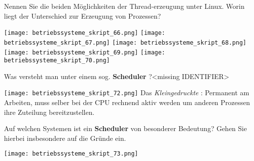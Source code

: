 \documentclass{article}
\begin{document}
\begin{tcolorbox}[colback=white!10!white,colframe=lightgray!75!black,
  savelowerto=\jobname_ex.tex,breakable,enhanced,lines before break=40]

\begin{center}
Nennen Sie die beiden Möglichkeiten der Thread-erzeugung unter Linux. 
Worin liegt der Unterschied zur Erzeugung von Prozessen?

\end{center}

\tcblower

\justifying
\texttt{[image: betriebssysteme\_skript\_66.png]}
\texttt{[image: betriebssysteme\_skript\_67.png]}
\texttt{[image: betriebssysteme\_skript\_68.png]}
\texttt{[image: betriebssysteme\_skript\_69.png]}
\texttt{[image: betriebssysteme\_skript\_70.png]}

\end{tcolorbox}
\begin{tcolorbox}[colback=white!10!white,colframe=lightgray!75!black,
  savelowerto=\jobname_ex.tex,breakable,enhanced,lines before break=40]

\begin{center}
Was versteht man unter einem sog. 
\textbf{Scheduler
}?<missing IDENTIFIER>

\end{center}

\tcblower

\justifying
\texttt{[image: betriebssysteme\_skript\_72.png]}
Das 
\textit{Kleingedruckte
}: 
Permanent am Arbeiten, muss selber bei der CPU rechnend aktiv werden um anderen Prozessen ihre Zuteilung bereitzustellen.

\end{tcolorbox}
\begin{tcolorbox}[colback=white!10!white,colframe=lightgray!75!black,
  savelowerto=\jobname_ex.tex,breakable,enhanced,lines before break=40]

\begin{center}
Auf welchen Systemen ist ein 
\textbf{Scheduler
} von besonderer Bedeutung? Gehen Sie hierbei insbesondere auf die Gründe ein.

\end{center}

\tcblower

\justifying
\texttt{[image: betriebssysteme\_skript\_73.png]}

\end{tcolorbox}
\end{document}

